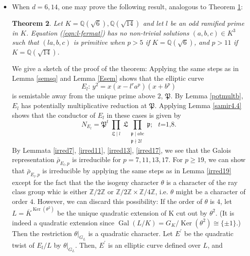 \documentclass[]{article}
\newtheorem{theorem}{Theorem}
\newcommand {\ZZ}{{\mathbb{Z}}}
\newcommand {\QQ}{{\mathbb{Q}}}
\newcommand {\mfp}{{\mathfrak{P}}}
\DeclareMathOperator{\Ker}{Ker}
\newcounter{cases}
\begin{document}
\begin{itemize}
    \begin{theorem}\label{thm:l-fermat;21}
        Let $K=\QQ(\sqrt{21})$ and let $l$ be an odd ramified prime in $K$. The generalized Fermat equation 
        \begin{equation}\label{eqn:l-fermat}
         l^ra^p+b^p+c^p=0   
        \end{equation}has no non-trivial solutions $(a,b,c)\in K^3$ such that $(la,b,c)$ is primitive and $2\mid abc$ when $p>7$.
    \end{theorem}
    \item When $d=6,14$, one may prove the following result, analogous to Theorem \ref{thm:l-fermat;21}:
    \begin{theorem}
       Let $K=\QQ(\sqrt{6}),\QQ(\sqrt{14})$ and let $l$ be an odd ramified prime in $K$. Equation (\ref{eqn:l-fermat}) has no non-trivial solutions $(a,b,c)\in K^3$ such that $(la,b,c)$ is primitive when $p>5$ if $K=\QQ(\sqrt{6})$, and $p>11$ if $K=\QQ(\sqrt{14})$.
    \end{theorem}We give a sketch of the proof of the theorem: Applying the same steps as in Lemma \ref{semsq} and Lemma \ref{Esem} shows that the elliptic curve $$\text{$E_l$:      } y^2=x(x-l^r a^p)(x+b^p)$$is semistable away from the unique prime above $2$, $\mfp$. By Lemma \ref{potmultb}, $E_l$ has potentially multiplicative reduction at $\mfp$. Applying Lemma \ref{samir4.4} shows that the conductor of $E_l$ in these cases is given by $$N_{E_l}=\mfp^t\prod_{\substack{\mathfrak{L} \mid l }} \mathfrak{L} \prod_{\substack{\mathfrak{p} \mid a b c \\ \mathfrak{p} \nmid 2l}} \mathfrak{p};\text{ $t$=1,8.}$$By Lemmata \ref{irred7}, \ref{irred11}, \ref{irred13}, \ref{irred17}, we see that the Galois representation $\bar{\rho}_{E_l,p}$ is irreducible for $p=7,11,13,17$. For $p\ge 19$, we can show that $\bar{\rho}_{E_l,p}$ is irreducible by applying the same steps as in Lemma \ref{irred19} except for the fact that the the isogeny character $\theta$ is a character of the ray class group whic is either $\ZZ/2\ZZ$ or $\ZZ/2\ZZ\times\ZZ/4\ZZ$, i.e. $\theta$ might be a character of order $4$. However, we can discard this possibility: If the order of $\theta$ is $4$, let $L=\overline{K}^{\Ker(\theta^2)}$ be the unique quadratic extension of K cut out by $\theta^2$. (It is indeed a quadratic extension since $\operatorname{Gal}(L/K)=G_K/\Ker(\theta^2)\cong \{\pm 1\}$.) Then the restriction $\theta|_{G_L}$ is a quadratic character. Let $E^{\prime}$ be the quadratic twist of $E_l/L$ by $\theta|_{G_L}$. Then, $E^{\prime}$ is an elliptic curve defined over $L$, and 

\end{itemize}
\end{document}
